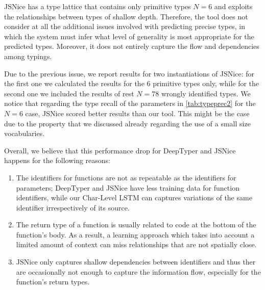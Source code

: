 \documentclass[sigplan,10pt,anonymous]{acmart} %
\theoremstyle{plain}
\theoremstyle{remark}
\theoremstyle{definition}
\begin{document}
JSNice has a type lattice that contains only primitive types $N = 6$ and exploits the relationships between types of shallow depth.
Therefore, the tool does not consider at all the additional issues involved with predicting precise types, in which the system must infer what level of generality is most appropriate for the predicted types.
Moreover, it does not entirely capture the flow and dependencies among typings.

Due to the previous issue, we report results for two instantiations of JSNice: for the first one we calculated the results for the $6$ primitive types only, while for the second one we included the results of rest $N=78$ wrongly identified types.
We notice that regarding the type recall of the parameters in \cref{tab:typeprec2} for the $N = 6$ case, JSNice scored better results than our tool.
This might be the case due to the property that we discussed already regarding the use of a small size vocabularies.


Overall, we believe that this performance drop for DeepTyper and JSNice happens for the following reasons:
\begin{enumerate}[label=(\roman*)]
  \item The identifiers for functions are not as repeatable as the identifiers for parameters; DeepTyper and JSNice have less training data for function identifiers, while our Char-Level LSTM can captures variations of the same identifier irrespectively of its source.
  \item The return type of a function is usually related to code at the bottom of the function's body.
        As a result, a learning approach which takes into account a limited amount of context can miss relationships that are not spatially close.
  \item JSNice only captures shallow dependencies between identifiers and thus ther are occasionally not enough to capture the information flow, especially for the function's return types.
\end{enumerate}
\end{document}
